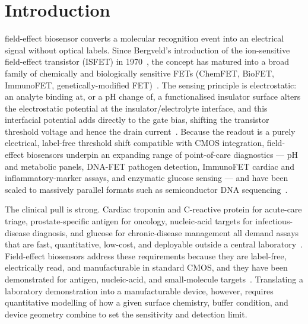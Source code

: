 \documentclass[10pt,journal]{IEEEtran}
\begin{document}
\section{Introduction}
 field-effect biosensor converts a molecular recognition
event into an electrical signal without optical labels. Since Bergveld's
introduction of the ion-sensitive field-effect transistor (ISFET) in
1970~\cite{bergveld1970}, the concept has matured into a broad family of
chemically and biologically sensitive FETs (ChemFET, BioFET, ImmunoFET,
genetically-modified FET)~\cite{bergveld2003,schoning2002}. The sensing principle
is electrostatic: an analyte binding at, or a pH change of, a functionalised
insulator surface alters the electrostatic potential at the
insulator/electrolyte interface, and this interfacial potential adds directly to
the gate bias, shifting the transistor threshold voltage and hence the drain
current~\cite{poghossian2014,kaisti2017}. Because the readout is a purely
electrical, label-free threshold shift compatible with CMOS integration,
field-effect biosensors underpin an expanding range of point-of-care
diagnostics --- pH and metabolic panels, DNA-FET pathogen detection, ImmunoFET
cardiac and inflammatory-marker assays, and enzymatic glucose sensing --- and
have been scaled to massively parallel formats such as semiconductor DNA
sequencing~\cite{rothberg2011,kimura2018,vu2020}.

The clinical pull is strong. Cardiac troponin and C-reactive protein for
acute-care triage, prostate-specific antigen for oncology, nucleic-acid targets
for infectious-disease diagnosis, and glucose for chronic-disease management all
demand assays that are fast, quantitative, low-cost, and deployable outside a
central laboratory~\cite{kimura2018,syu2018,vu2020}. Field-effect biosensors
address these requirements because they are label-free, electrically read, and
manufacturable in standard CMOS, and they have been demonstrated for antigen,
nucleic-acid, and small-molecule targets~\cite{stern2007,sakata2005,rothberg2011}.
Translating a laboratory demonstration into a manufacturable device, however,
requires quantitative modelling of how a given surface chemistry, buffer
condition, and device geometry combine to set the sensitivity and detection
limit.
\end{document}
